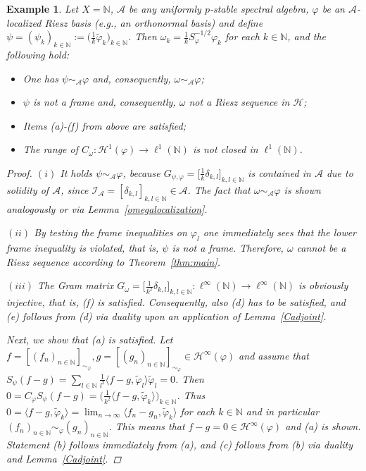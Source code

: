 \documentclass{amsart}
\newtheorem{example}[theorem]{Example}
\def\Hil{\mathcal{H}}
\newcommand{\A}[0]{{\mathcal{A}}}
\begin{document}
\begin{example}\label{counterexample}
Let $X=\mathbb{N}$, $\A$ be any uniformly $p$-stable spectral algebra, $\varphi$ be an $\mathcal{A}$-localized Riesz basis (e.g., an orthonormal basis) and define $\psi=(\psi_k)_{k\in \mathbb{N}}:=\big(\frac{1}{k}\widetilde\varphi_k\big)_{k\in \mathbb{N}}$. Then $\omega_k=\frac{1}{k}S_\varphi^{-1/2}\varphi_k$ for each $k\in \mathbb{N}$, and the following hold:
\begin{itemize}
    \item[(i)] One has $\psi \sim_{\A} \varphi$ and, consequently, $\omega \sim_{\A} \varphi$;
    \item[(ii)] $\psi$ is not a frame and, consequently, $\omega$ not a Riesz sequence in $\Hil$;
    \item[(iii)] Items (a)-(f) from above are satisfied;
    \item[(iv)] The range of $C_{\omega}:\Hil^1(\varphi)\to \ell^1(\mathbb{N})$ is not closed in $\ell^1(\mathbb{N})$. 
\end{itemize}

\begin{proof}
$(i)$ It holds $\psi \sim_{\A}\varphi$, because $G_{\psi,\varphi} = \big[\frac{1}{k}\delta_{k,l}\big]_{k,l\in \mathbb{N}}$ is contained in $\A$ due to solidity of $\A$, since $\mathcal{I}_{\A} = [\delta_{k,l}]_{k,l\in \mathbb{N}} \in \A$. The fact that $\omega \sim_{\A} \varphi$ is shown analogously or via Lemma~\ref{omegalocalization}.

$(ii)$ By testing the frame inequalities on $\varphi_l$ one immediately sees that the lower frame inequality is violated, that is, $\psi$ is \emph{not} a frame. Therefore, $\omega$ cannot be a Riesz sequence according to Theorem~\ref{thm:main}. 

$(iii)$ The Gram matrix $G_\omega = \big[\frac{1}{k^2}\delta_{k,l}\big]_{k,l\in \mathbb{N}}:\ell^\infty(\mathbb{N})\to\ell^\infty(\mathbb{N})$ is obviously injective, that is, (f) is satisfied. Consequently, also (d) has to be satisfied, and (e) follows from (d) via duality upon an application of Lemma~\ref{Cadjoint}. 

Next, we show that (a) is satisfied. Let $f=[(f_n)_{n\in \mathbb{N}}]_{\sim_{\varphi}}, g=[(g_n)_{n\in \mathbb{N}}]_{\sim_{\varphi}} \in \Hil^{\infty}(\varphi)$ and assume that $S_{\psi} (f-g)=\sum_{l\in \mathbb{N}}\frac{1}{l^2}\langle f-g,\widetilde{\varphi}_l\rangle\widetilde{\varphi}_l = 0$. Then $0=C_{\varphi}S_{\psi}(f-g) = \big(\frac{1}{k^2}\langle f-g, \widetilde{\varphi}_k\rangle\big)_{k\in \mathbb{N}}$. Thus $0 = \langle f-g, \widetilde{\varphi}_k\rangle = \lim_{n\to\infty}\langle f_n - g_n, \widetilde{\varphi}_k\rangle$ for each $k\in \mathbb{N}$ and in particular $(f_n)_{n\in \mathbb{N}}\sim_{\varphi}(g_n)_{n\in \mathbb{N}}$. This means that $f-g=0\in \Hil^{\infty}(\varphi)$ and (a) is shown. Statement (b) follows immediately from (a), and (c) follows from (b) via duality and Lemma~\ref{Cadjoint}.   


\end{proof}
\end{example}
\end{document}
